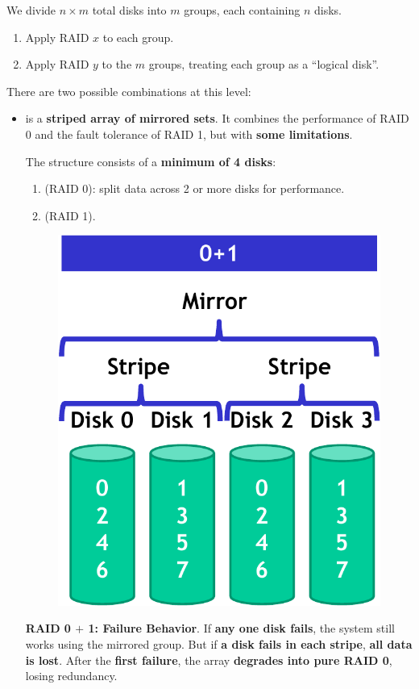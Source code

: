 \highspace
We divide $n \times m$ total disks into $m$ groups, each containing $n$ disks.
\begin{enumerate}
    \item Apply RAID $x$ to each group.
    \item Apply RAID $y$ to the $m$ groups, treating each group as a ``logical disk''.
\end{enumerate}
There are two possible combinations at this level:
\begin{itemize}
    \item {} is a \textbf{striped array of mirrored sets}. It combines the performance of RAID 0 and the fault tolerance of RAID 1, but with \textbf{some limitations}.

    The structure consists of a \textbf{minimum of 4 disks}:
    \begin{enumerate}
        \item {} (RAID 0): split data across 2 or more disks for performance.
        \item {} (RAID 1).
    \end{enumerate}

    \newpage

    \begin{figure}[!htp]
        \centering
        \includegraphics[width=.39\textwidth]{img/raid-3.pdf}
    \end{figure}

    \textcolor{Red2}{ \textbf{RAID 0 $+$ 1: Failure Behavior}}. If \textbf{any one disk fails}, the system still works using the mirrored group. But if \textbf{a disk fails in each stripe}, \textbf{all data is lost}. After the \textbf{first failure}, the array \textbf{degrades into pure RAID 0}, losing redundancy.


\end{itemize}
